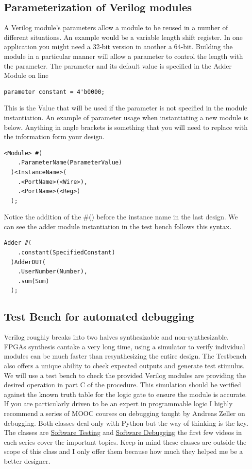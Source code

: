 \documentclass[12pt,journal]{IEEEtran}
\begin{document}
    \subsection{Parameterization of Verilog modules}
      A Verilog module's parameters allow a module to be reused in a number of different situations. An example would be a variable length shift register. In one application you might need a 32-bit version in another a 64-bit. Building the module in a particular manner will allow a parameter to control the length with the parameter. The parameter and its default value is specified in the Adder Module on line
      \begin{lstlisting}
parameter constant = 4'b0000;
      \end{lstlisting}
      This is the Value that will be used if the parameter is not specified in the module instantiation. An example of parameter usage when instantiating a new module is below. Anything in angle brackets is something that you will need to replace with the information form your design.
    \begin{lstlisting}[caption={Module instantiation template with parameterization}]
<Module> #(
    .ParameterName(ParameterValue)
  )<InstanceName>(
    .<PortName>(<Wire>),
    .<PortName>(<Reg>)
  );
    \end{lstlisting}
    Notice the addition of the \#() before the instance name in the last design. We can see the adder module instantiation in the test bench follows this syntax.
    \begin{lstlisting}[caption={Module instantiation from Adder test bench}]
Adder #(
    .constant(SpecifiedConstant)
  )AdderDUT(
    .UserNumber(Number),
    .sum(Sum)
  );
    \end{lstlisting}

      \subsection{Test Bench for automated debugging}
      Verilog roughly breaks into two halves synthesizable and non-synthesizable. FPGAs synthesis cantake a very long time, using a simulator to verify individual modules can be much faster than resynthesizing the entire design. The Testbench also offers a unique ability to check expected outputs and generate test stimulus. We will use a test bench to check the provided Verilog modules are providing the desired operation in part C of the procedure. This simulation should be verified against the known truth table for the logic gate to ensure the module is accurate. If you are particularly driven to be an expert in programmable logic I highly recommend a series of MOOC courses on debugging taught by Andreas Zeller on debugging. Both classes deal only with Python but the way of thinking is the key. The classes are \href{https://www.udacity.com/course/cs258}{Software Testing} and \href{https://www.udacity.com/course/cs259}{Software Debugging} the first few videos in each series cover the important topics. Keep in mind these classes are outside the scope of this class and I only offer them because how much they helped me be a better designer. 
\end{document}
